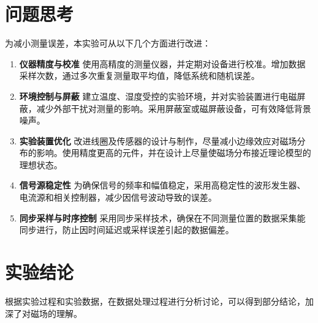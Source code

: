 \documentclass[12pt,a4paper]{article}
\begin{document}
	\section{问题思考}
	为减小测量误差，本实验可从以下几个方面进行改进：
	\begin{enumerate}
  	\item \textbf{仪器精度与校准}  
  	使用高精度的测量仪器，并定期对设备进行校准。增加数据采样次数，通过多次重复测量取平均值，降低系统和随机误差。
  	\item \textbf{环境控制与屏蔽}  
 	建立温度、湿度受控的实验环境，并对实验装置进行电磁屏蔽，减少外部干扰对测量的影响。采用屏蔽室或磁屏蔽设备，可有效降低背景噪声。
  	\item \textbf{实验装置优化}  
  	改进线圈及传感器的设计与制作，尽量减小边缘效应对磁场分布的影响。使用精度更高的元件，并在设计上尽量使磁场分布接近理论模型的理想状态。
  	\item \textbf{信号源稳定性}  
  	为确保信号的频率和幅值稳定，采用高稳定性的波形发生器、电流源和相关控制器，减少因信号波动导致的误差。
  	\item \textbf{同步采样与时序控制}  
  	采用同步采样技术，确保在不同测量位置的数据采集能同步进行，防止因时间延迟或采样误差引起的数据偏差。
	\end{enumerate}

	
	\section{实验结论}
	根据实验过程和实验数据，在数据处理过程进行分析讨论，可以得到部分结论，加深了对磁场的理解。
\end{document}
